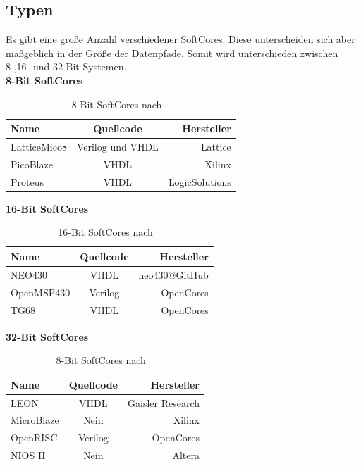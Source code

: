 \subsection{Typen}\label{kap:typen}
Es gibt eine große Anzahl verschiedener SoftCores. Diese unterscheiden sich aber maßgeblich in der Größe der Datenpfade.
Somit wird unterschieden zwischen 8-,16- und 32-Bit Systemen.\cite{softcore}\\

\textbf{8-Bit SoftCores}\\
\begin{table}[H]
\centering
\begin{tabular}{|l|c|r|}
  \hline
  \textbf{Name} & \textbf{Quellcode} & \textbf{Hersteller}\\
  \hline
  LatticeMico8 & Verilog und VHDL & Lattice\\
  \hline
  PicoBlaze & VHDL & Xilinx\\
  \hline
  Proteus & VHDL & LogicSolutions\\
  \hline
\end{tabular}
  \caption{8-Bit SoftCores nach ~\cite{softcore}}
 \label{tab:8bitsysteme}
  \end{table}

  \textbf{16-Bit SoftCores}\\
  \begin{table}[H]
  \centering
  \begin{tabular}{|l|c|r|}
    \hline
  \textbf{Name} & \textbf{Quellcode} & \textbf{Hersteller}\\
    \hline
    NEO430 & VHDL & neo430@GitHub\\
    \hline
    OpenMSP430 & Verilog & OpenCores\\
    \hline
    TG68 & VHDL & OpenCores\\
    \hline
  \end{tabular}
    \caption{16-Bit SoftCores nach ~\cite{softcore}}
   \label{tab:16bitsysteme}
    \end{table}

    \textbf{32-Bit SoftCores}\\
    \begin{table}[H]
    \centering
    \begin{tabular}{|l|c|r|}
      \hline
    \textbf{Name} & \textbf{Quellcode} & \textbf{Hersteller}\\
      \hline
      LEON & VHDL & Gaisler Research\\
      \hline
      MicroBlaze & Nein & Xilinx\\
      \hline
      OpenRISC & Verilog & OpenCores\\
      \hline
      NIOS II & Nein & Altera\\
      \hline
    \end{tabular}
      \caption{8-Bit SoftCores nach ~\cite{softcore}}
     \label{tab:8bitsysteme}
      \end{table}

